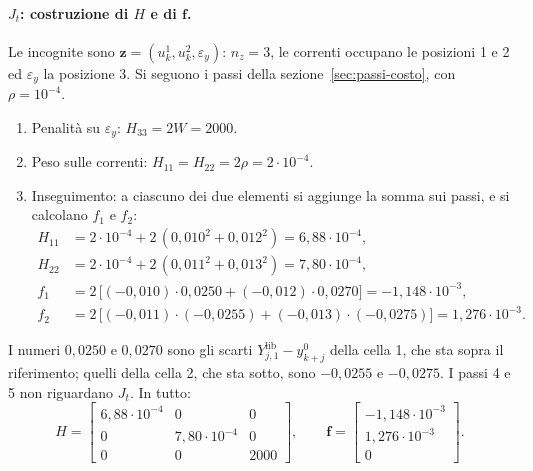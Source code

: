 \documentclass[11pt,a4paper]{article}
\newcommand{\vett}[1]{\boldsymbol{#1}}      %
\newcommand{\lib}{\mathrm{lib}}             %
\begin{document}
\paragraph{$J_t$: costruzione di $H$ e di $\vett{f}$.} Le incognite sono
$\vett{z} = (u^1_k, u^2_k, \varepsilon_y)$: $n_z = 3$, le correnti occupano le posizioni 1 e 2 ed
$\varepsilon_y$ la posizione 3. Si seguono i passi della sezione~\ref{sec:passi-costo},
con $\rho = 10^{-4}$.
\begin{enumerate}
  \item Penalità su $\varepsilon_y$: $H_{33} = 2W = 2000$.
  \item Peso sulle correnti: $H_{11} = H_{22} = 2\rho = 2 \cdot 10^{-4}$.
  \item Inseguimento: a ciascuno dei due elementi si aggiunge la somma sui
        passi, e si calcolano $f_1$ e $f_2$:
        \begin{align*}
          H_{11} &= 2 \cdot 10^{-4} + 2\,(0{,}010^2 + 0{,}012^2)
                  = 6{,}88 \cdot 10^{-4} , \\
          H_{22} &= 2 \cdot 10^{-4} + 2\,(0{,}011^2 + 0{,}013^2)
                  = 7{,}80 \cdot 10^{-4} , \\
          f_1 &= 2\,\bigl[(-0{,}010) \cdot 0{,}0250 + (-0{,}012) \cdot 0{,}0270\bigr]
                  = -1{,}148 \cdot 10^{-3} , \\
          f_2 &= 2\,\bigl[(-0{,}011) \cdot (-0{,}0255) + (-0{,}013) \cdot (-0{,}0275)\bigr]
                  = 1{,}276 \cdot 10^{-3} .
        \end{align*}
\end{enumerate}
I numeri $0{,}0250$ e $0{,}0270$ sono gli scarti $Y^\lib_{j,1} - y^0_{k+j}$ della cella
1, che sta sopra il riferimento; quelli della cella 2, che sta sotto, sono
$-0{,}0255$ e $-0{,}0275$. I passi 4 e 5 non riguardano $J_t$. In tutto:
\[
  H = \begin{bmatrix}
        6{,}88 \cdot 10^{-4} & 0 & 0 \\
        0 & 7{,}80 \cdot 10^{-4} & 0 \\
        0 & 0 & 2000
      \end{bmatrix} ,
  \qquad
  \vett{f} = \begin{bmatrix} -1{,}148 \cdot 10^{-3} \\ 1{,}276 \cdot 10^{-3} \\ 0 \end{bmatrix} .
\]
\end{document}
